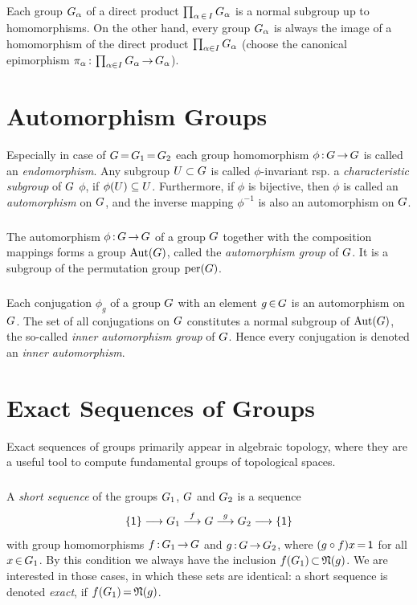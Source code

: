 \documentclass[11pt,twoside]{article}
\begin{document}
\subparagraph{}
Each group $G_{\alpha}$ of a direct product
$\prod_{\alpha {\,\in\,} I} G_{\alpha}$
is a normal subgroup up to homomorphisms.
On the other hand,
every group $G_{\alpha}$ is always the image of a homomorphism
of the direct product $\prod_{\alpha \in I} G_{\alpha}$
(choose the canonical epimorphism
$\pi_{\alpha}{\,:\,}\prod_{\alpha \in I} G_{\alpha} {\,\to\,} G_{\alpha}$).

\section{Automorphism Groups}
Especially in case of $G {\,=\,} G_1 {\,=\,} G_2$ each group homomorphism
$\phi{\,:\,}G {\,\to\,} G$ is called an \textit{endomorphism}.
Any subgroup $U \subset G$ is called $\phi$-invariant
rsp. a \textit{characteristic subgroup} of $G$ {\wrt} $\phi$,
if $\phi(U) \subseteq U$.
Furthermore,
if $\phi$ is bijective,
then $\phi$ is called an \textit{automorphism} on $G$,
and the inverse mapping $\phi^{-1}$ is also an automorphism on $G$.

\subparagraph{}
The automorphism $\phi {\,:\,} G {\,\to\,} G$ of a group $G$
together with the composition mappings
forms a group $\operatorname{Aut}(G)$,
called the \textit{automorphism group} of $G$.
It is a subgroup of the permutation group $\operatorname{per}(G)$.

\subparagraph{}
Each conjugation $\phi_g$ of a group $G$ with an element $g {\,\in\,} G$
is an automorphism on $G$.
The set of all conjugations on $G$ constitutes a normal subgroup of
$\operatorname{Aut}(G)$,
the so-called \textit{inner automorphism group} of $G$.
Hence every conjugation is denoted an \textit{inner automorphism}.

\section{Exact Sequences of Groups}
Exact sequences of groups primarily appear in algebraic topology,
where they are a useful tool to compute fundamental groups of topological spaces.

\subparagraph{}
A \textit{short sequence} of the groups $G_1$, $G$ and $G_2$
is a sequence
\[
        \{{\mathsf{1}} \}
        \longrightarrow G_1
        \stackrel{f}{\longrightarrow} G
        \stackrel{g}{\longrightarrow} G_2
        \longrightarrow                  \{{\mathsf{1}} \}
\]
with group homomorphisms $f {\,:\,}G_1 {\,\to\,} G$ and $g{\,:\,}G {\,\to\,} G_2$,
where $(g \circ f) x {\,=\,} {\mathsf{1}}$ for all $x {\,\in\,} G_1$.
By this condition we always have the inclusion $f(G_1) {\,\subset\,} \mathfrak{N}(g)$.
We are interested in those cases, in which these sets are identical:
a short sequence is denoted \textit{exact},
if $f(G_1) {\,=\,} \mathfrak{N}(g)$.
\end{document}
